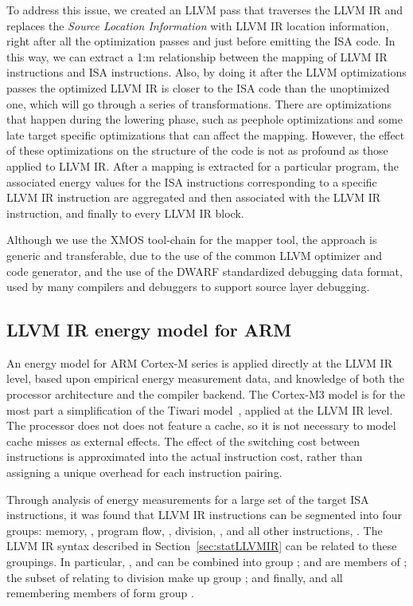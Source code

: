 \documentclass[9pt,preprint]{sigplanconf}
\newcommand{\secref}[1]{Section~\ref{sec:#1}}
\begin{document}
To address this issue, we created an LLVM pass that traverses the LLVM IR and
replaces the \emph{Source Location Information} with LLVM IR location information,
right after all the optimization passes and just before emitting the ISA code.
In this way, we can extract a 1:m relationship between the mapping of LLVM
IR instructions and ISA instructions.
Also, by doing it after the LLVM optimizations
passes the optimized LLVM IR is closer to the ISA code than the unoptimized one,
which will go through a series of transformations.
There are optimizations that happen during the lowering phase,
such as peephole optimizations and some late target specific optimizations
that can affect the mapping. However, the effect of these optimizations on the
structure of the code is not as profound as those
applied to LLVM IR. After a mapping is extracted for a particular program,
the associated energy values for the ISA instructions corresponding
to a specific LLVM IR instruction are aggregated and then associated with the LLVM
IR instruction, and finally to every LLVM IR block.

Although we use the XMOS tool-chain for the mapper tool, the approach is generic
and
transferable, due to the use of the common LLVM optimizer and code generator,
and the use of the DWARF standardized debugging data format, used by many
compilers and debuggers to support source layer debugging.

\subsection{LLVM IR energy model for ARM}
An energy model for ARM Cortex-M series is applied directly at the LLVM IR
level, based upon empirical energy measurement data, and knowledge of both the
processor architecture and the compiler backend. The Cortex-M3 model is for the
most part a simplification of the Tiwari model~\cite{Tiwari-embedded-1994},
applied at the LLVM IR level.  The processor does not does not feature a cache,
so it is not necessary to model cache misses as external effects. The effect of
the switching cost between instructions is approximated into the actual
instruction cost, rather than assigning a unique overhead for each instruction
pairing.

Through analysis of energy measurements for a large set of the target ISA
instructions, it was found that LLVM IR instructions can be segmented into four
groups: memory, , program flow, , division, , and all other
instructions, . The LLVM IR syntax described in \secref{statLLVMIR} can be
related to these groupings. In particular, ,  and  can be
combined into group ;  and  are members of ; the
subset of  relating to division make up group ; and finally,  and
all remembering members of  form group .
\end{document}
